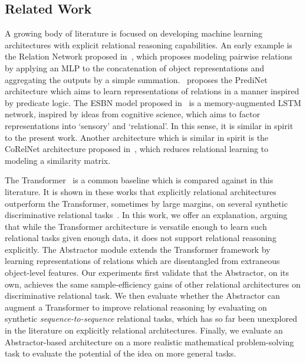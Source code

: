 \subsection{Related Work}\label{ssec:related_work}
A growing body of literature is focused on developing machine learning architectures with explicit relational reasoning capabilities. An early example is the Relation Network proposed in~\citep{santoro1}, which proposes modeling pairwise relations by applying an MLP to the concatenation of object representations and aggregating the outputs by a simple summation.~\citep{shanahanExplicitlyRelationalNeural} proposes the PrediNet architecture which aims to learn representations of relations in a manner inspired by predicate logic. The ESBN model proposed in~\citep{esbn} is a memory-augmented LSTM network, inspired by ideas from cognitive science, which aims to factor representations into `sensory' and `relational'. In this sense, it is similar in spirit to the present work. Another architecture which is similar in spirit is the CoRelNet architecture proposed in~\citep{kerg2022neural}, which reduces relational learning to modeling a similarity matrix.

The Transformer~\citep{vaswani2017attention} is a common baseline which is compared against in this literature. It is shown in these works that explicitly relational architectures outperform the Transformer, sometimes by large margins, on several synthetic discriminative relational tasks~\citep{shanahanExplicitlyRelationalNeural,esbn,kerg2022neural}. In this work, we offer an explanation, arguing that while the Transformer architecture is versatile enough to learn such relational tasks given enough data, it does not support relational reasoning explicitly. The Abstractor module extends the Transformer framework by learning representations of relations which are disentangled from extraneous object-level features. Our experiments first validate that the Abstractor, on its own, achieves the same sample-efficiency gains of other relational architectures on discriminative relational task. We then evaluate whether the Abstractor can augment a Transformer to improve relational reasoning by evaluating on synthetic \textit{sequence-to-sequence} relational tasks, which has so far been unexplored in the literature on explicitly relational architectures. Finally, we evaluate an Abstractor-based architecture on a more realistic mathematical problem-solving task to evaluate the potential of the idea on more general tasks.